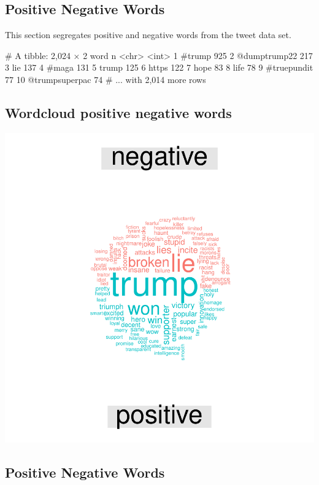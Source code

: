 \documentclass[a4paper,12pt]{book}
\theoremstyle{break}
\begin{document}
\subsection{Positive Negative Words}

This section segregates positive and negative words from the tweet data set.

\begin{Schunk}
\begin{Soutput}
# A tibble: 2,024 × 2
             word     n
            <chr> <int>
1          #trump   925
2    @dumptrump22   217
3             lie   137
4           #maga   131
5           trump   125
6           https   122
7            hope    83
8            life    78
9     #truepundit    77
10 @trumpsuperpac    74
# ... with 2,014 more rows
\end{Soutput}
\end{Schunk}

\subsection{Wordcloud positive negative words}

\includegraphics{finnn-r13}

\subsection{Positive Negative Words}
\end{document}
